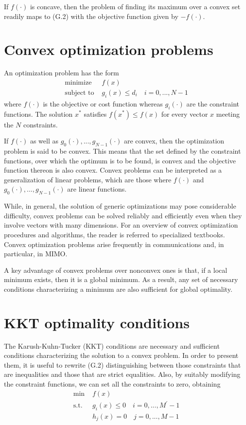 \documentclass[a4paper, 12pt]{book}
\begin{document}
If $f(\cdot)$ is concave, then the problem of finding its maximum over a convex set readily maps to (G.2) with the objective function given by $-f(\cdot)$.

\section{Convex optimization problems}
An optimization problem has the form
\begin{align}
    \text{minimize } & f(x) \nonumber \\
    \text{subject to } & g_{i}(x)\le d_{i} \quad i=0,...,N-1 \tag{G.2}
\end{align}
where $f(\cdot)$ is the objective or cost function whereas $g_{i}(\cdot)$ are the constraint functions. The solution $x^{*}$ satisfies $f(x^{*})\le f(x)$ for every vector $x$ meeting the $N$ constraints.

If $f(\cdot)$ as well as $g_{0}(\cdot),...,g_{N-1}(\cdot)$ are convex, then the optimization problem is said to be convex. This means that the set defined by the constraint functions, over which the optimum is to be found, is convex and the objective function thereon is also convex. Convex problems can be interpreted as a generalization of linear problems, which are those where $f(\cdot)$ and $g_{0}(\cdot),...,g_{N-1}(\cdot)$ are linear functions.

While, in general, the solution of generic optimizations may pose considerable difficulty, convex problems can be solved reliably and efficiently even when they involve vectors with many dimensions. For an overview of convex optimization procedures and algorithms, the reader is referred to specialized textbooks. Convex optimization problems arise frequently in communications and, in particular, in MIMO.

A key advantage of convex problems over nonconvex ones is that, if a local minimum exists, then it is a global minimum. As a result, any set of necessary conditions characterizing a minimum are also sufficient for global optimality.

\section{KKT optimality conditions}
The Karush-Kuhn-Tucker (KKT) conditions are necessary and sufficient conditions characterizing the solution to a convex problem. In order to present them, it is useful to rewrite (G.2) distinguishing between those constraints that are inequalities and those that are strict equalities. Also, by suitably modifying the constraint functions, we can set all the constraints to zero, obtaining
\begin{align}
    \text{min } & f(x) \nonumber \\
    \text{s.t. } & g_{i}(x)\le0 \quad i=0,...,M^{\prime}-1 \tag{G.3} \\
    & h_{j}(x)=0 \quad j=0,...,M-1 \nonumber
\end{align}
\end{document}
